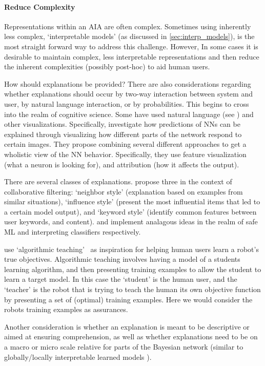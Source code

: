 \paragraph{Reduce Complexity} \label{sec:reduce_complexity}
Representations within an AIA are often complex. Sometimes using inherently less complex, `interpretable models' (as discussed in \ref{sec:interp_models}), is the most straight forward way to address this challenge. However, In some cases it is desirable to maintain complex, less interpretable representations and then reduce the inherent complexities (possibly post-hoc) to aid human users.

How should explanations be provided? There are also considerations regarding whether explanations should occur by two-way interaction between system and user, by natural language interaction, or by probabilities. This begins to cross into the realm of cognitive science. Some have used natural language (see \cite{Hayes2017-nt}) and other visualizations. Specifically, \citet{Olah2018-rp} investigate how predictions of NNs can be explained through visualizing how different parts of the network respond to certain images. They propose combining several different approaches to get a wholistic view of the NN behavior. Specifically, they use feature visualization (what a neuron is looking for), and attribution (how it affects the output).

There are several classes of explanations. \citet{Abdollahi2018-uw} propose three in the context of collaborative filtering: `neighbor style' (explanation based on examples from similar situations), `influence style' (present the most influential items that led to a certain model output), and `keyword style' (identify common features between user keywords, and content). \citet{Otte2013-oo} and \citet{Ribeiro2016-uc} implement analagous ideas in the realm of safe ML and interpreting classifiers respectively.

\citet{Huang2017-lk} use `algorithmic teaching'~\cite{Balbach2009-jw} as inspiration for helping human users learn a robot's true objectives. Algorithmic teaching involves having a model of a students learning algorithm, and then presenting training examples to allow the student to learn a target model. In this case the `student' is the human user, and the `teacher' is the robot that is trying to teach the human its own objective function by presenting a set of (optimal) training examples. Here we would consider the robots training examples as assurances.

Another consideration is whether an explanation is meant to be descriptive or aimed at ensuring comprehension, as well as whether explanations need to be on a macro or micro scale relative for parts of the Bayesian network (similar to globally/locally interpretable learned models \cite{Ruping2006-xj}).

